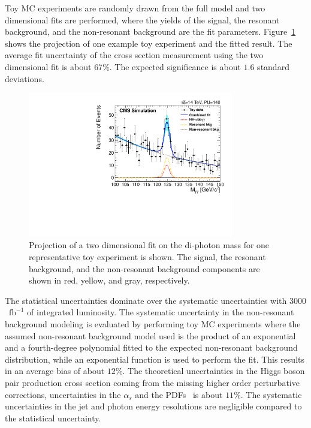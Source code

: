 Toy MC experiments are randomly drawn from the full model and two dimensional fits are performed, where the yields of the signal, the resonant background, and the non-resonant background are the fit parameters.  Figure~\ref{fig:twoDfullFitProjection} shows the projection of one example toy experiment and the fitted result. 
The average fit uncertainty of the cross section measurement using the two dimensional fit is about $67\%$. The expected significance is about $1.6$ standard deviations. 
\begin{figure}[h]
  \centering
  \includegraphics[width=0.8\textwidth]{figures_chapter6/hh_bbgg_mgg.pdf}
  \caption{Projection of a two dimensional fit on the di-photon mass for one representative
  toy experiment is shown. The signal, the resonant background, and the non-resonant background components are shown in 
  red, yellow, and gray, respectively.}
  \label{fig:twoDfullFitProjection}
\end{figure}
The statistical uncertainties dominate over the systematic uncertainties with $3000$~$\mathrm{fb}^{-1}$ of integrated luminosity. The systematic uncertainty in the non-resonant background modeling is evaluated by  performing toy MC experiments where the assumed non-resonant background model used is the product of an exponential and a fourth-degree polynomial fitted to the expected non-resonant background distribution, while an exponential function is used to perform the fit. This results in an
average bias of about $12\%$. The theoretical uncertainties in the Higgs boson pair production cross section coming from the missing higher order perturbative corrections, uncertainties in the $\alpha_{s}$ and the PDFs~\cite{Baglio:2012np} is about $11\%$. The systematic uncertainties in the jet and photon energy resolutions are negligible compared to the statistical uncertainty.

